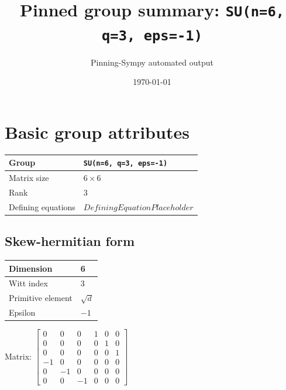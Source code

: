 \documentclass[11pt]{article}
\title{Pinned group summary: \texttt{SU(n=6, q=3, eps=-1)}}
\author{Pinning-Sympy automated output}
\date{\today}
\theoremstyle{definition}
\begin{document}
\maketitle
\tableofcontents

\newpage

\section{Basic group attributes}

\begin{tabular}{|l|l|}
	\hline
    Group & \texttt{SU(n=6, q=3, eps=-1)} \\
	\hline
    Matrix size & $6 \times 6$ \\
	\hline
    Rank & $3$ \\
	\hline
	Defining equations & $DefiningEquationPlaceholder$ \\
	\hline
\end{tabular}

\subsection{Skew-hermitian form}
\begin{tabular}{|l|l|}
    \hline
    Dimension & 6 \\
    \hline
    Witt index & 3 \\
    \hline
    Primitive element & $\sqrt{d}$ \\
    \hline
    Epsilon & $-1$ \\
    \hline
\end{tabular}

\bigskip
\noindent Matrix: \(
\left[\begin{matrix}0 & 0 & 0 & 1 & 0 & 0\\0 & 0 & 0 & 0 & 1 & 0\\0 & 0 & 0 & 0 & 0 & 1\\-1 & 0 & 0 & 0 & 0 & 0\\0 & -1 & 0 & 0 & 0 & 0\\0 & 0 & -1 & 0 & 0 & 0\end{matrix}\right]
\)
\end{document}
